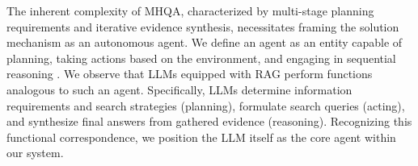The inherent complexity of MHQA, characterized by multi-stage planning requirements and iterative evidence synthesis, necessitates framing the solution mechanism as an autonomous agent.
We define an agent as an entity capable of planning, taking actions based on the environment, and engaging in sequential reasoning \cite{liu2025advances}.
We observe that LLMs equipped with RAG perform functions analogous to such an agent. Specifically, LLMs determine information requirements and search strategies (planning), formulate search queries (acting), and synthesize final answers from gathered evidence (reasoning). Recognizing this functional correspondence, we position the LLM itself as the core agent within our system.




